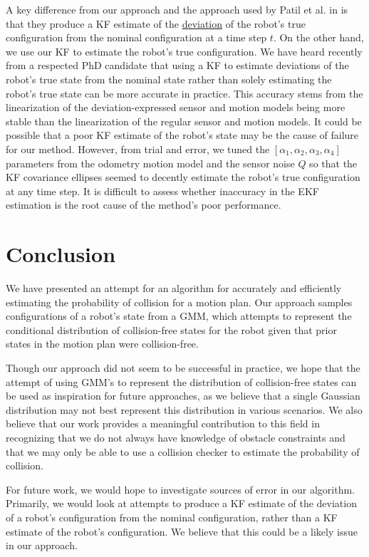 \documentclass[journal]{IEEEtran}
\begin{document}
A key difference from our approach and the approach used by Patil et al. in \cite{IEEEhowto:patil} is that they produce a KF estimate of the \underline{deviation} of the robot's true configuration from the nominal configuration at a time step $t$. On the other hand, we use our KF to estimate the robot's true configuration. We have heard recently from a respected PhD candidate that using a KF to estimate deviations of the robot's true state from the nominal state rather than solely estimating the robot's true state can be more accurate in practice. This accuracy stems from the linearization of the deviation-expressed sensor and motion models being more stable than the linearization of the regular sensor and motion models.
It could be possible that a poor KF estimate of the robot's state may be the cause of failure for our method. However, from trial and error, we tuned the $[\alpha_1,\alpha_2,\alpha_3,\alpha_4]$ parameters from the odometry motion model and the sensor noise $Q$ so that the KF covariance ellipses seemed to decently estimate the robot's true configuration at any time step. It is difficult to assess whether inaccuracy in the EKF estimation is the root cause of the method's poor performance.

\section{Conclusion}
We have presented an attempt for an algorithm for accurately and efficiently estimating the probability of collision for a motion plan. Our approach samples configurations of a robot's state from a GMM, which attempts to represent the conditional distribution of collision-free states for the robot given that prior states in the motion plan were collision-free.

Though our approach did not seem to be successful in practice, we hope that the attempt of using GMM's to represent the distribution of collision-free states can be used as inspiration for future approaches, as we believe that a single Gaussian distribution may not best represent this distribution in various scenarios. We also believe that our work provides a meaningful contribution to this field in recognizing that we do not always have knowledge of obstacle constraints and that we may only be able to use a collision checker to estimate the probability of collision.

For future work, we would hope to investigate sources of error in our algorithm. Primarily, we would look at attempts to produce a KF estimate of the deviation of a robot's configuration from the nominal configuration, rather than a KF estimate of the robot's configuration. We believe that this could be a likely issue in our approach.
\end{document}
